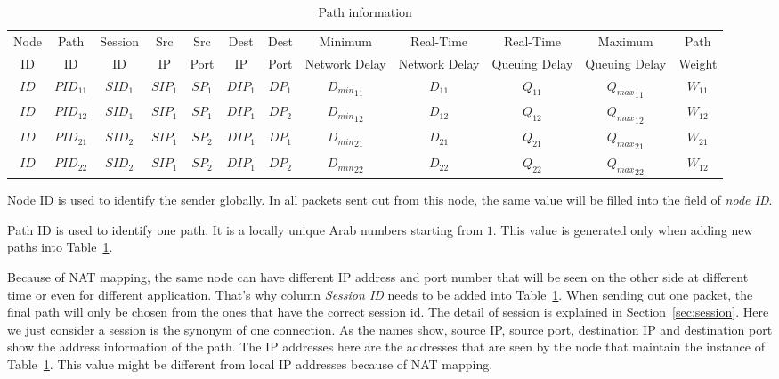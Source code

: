 \begin{table}
\small
\caption{\label{tb.pi}Path information}
\centering
\begin{tabular}{|c|c|c|c|c|c|c|c|c|c|c|c|}
\hline
Node &  Path & Session & Src &   Src & Dest & Dest &   Minimum       & Real-Time      & Real-Time      & Maximum       & Path   \\
 ID  &   ID  & ID & IP  &  Port &  IP  & Port &  Network Delay  & Network Delay  & Queuing Delay  & Queuing Delay & Weight \\
\hline
$ID$&${PID}_{11}$&${SID}_{1}$&${SIP}_{1}$&${SP}_{1}$&${DIP}_{1}$&${DP}_{1}$&${D_{min}}_{11}$&$D_{11}$&${Q}_{11}$&${{Q}_{max}}_{11}$&$W_{11}$\\
\hline
$ID$&${PID}_{12}$&${SID}_{1}$&${SIP}_{1}$&${SP}_{1}$&${DIP}_{1}$&${DP}_{2}$&${D_{min}}_{12}$&$D_{12}$&${Q}_{12}$&${{Q}_{max}}_{12}$&$W_{12}$\\
\hline
$ID$&${PID}_{21}$&${SID}_{2}$&${SIP}_{1}$&${SP}_{2}$&${DIP}_{1}$&${DP}_{1}$&${D_{min}}_{21}$&$D_{21}$&${Q}_{21}$&${{Q}_{max}}_{21}$&$W_{21}$\\
\hline
$ID$&${PID}_{22}$&${SID}_{2}$&${SIP}_{1}$&${SP}_{2}$&${DIP}_{1}$&${DP}_{2}$&${D_{min}}_{22}$&$D_{22}$&${Q}_{22}$&${{Q}_{max}}_{22}$&$W_{12}$\\
\hline
\end{tabular}
\end{table}

Node ID is used to identify the sender globally. In all packets sent out from this node, the same value will be filled into the field of \emph{node ID}.

Path ID is used to identify one path. It is a locally unique Arab numbers starting from $1$. This value is generated only when adding new paths into Table~\ref{tb.pi}. 

Because of NAT mapping, the same node can have different IP address and port number that will be seen on the other side at different time or even for different application. That's why column \emph{Session ID} needs to be added into Table~\ref{tb.pi}. When sending out one packet, the final path will only be chosen from the ones that have the correct session id. The detail of session is explained in Section~\ref{sec:session}. Here we just consider a session is the synonym of one connection. As the names show, source IP, source port, destination IP and destination port show the address information of the path. The IP addresses here are the addresses that are seen by the node that maintain the instance of Table~\ref{tb.pi}. This value might be different from local IP addresses because of NAT mapping.

